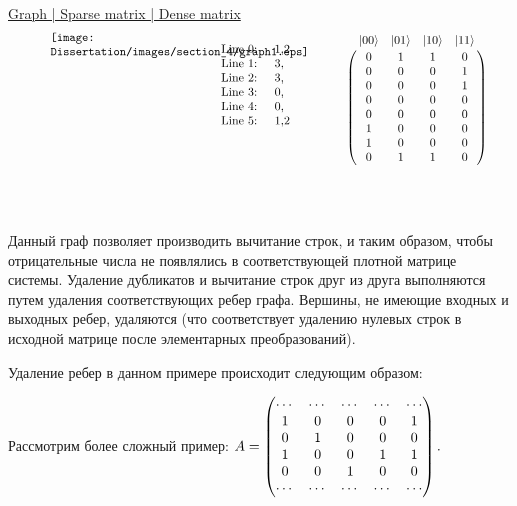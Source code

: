 \hspace{1em}\underline{\hspace{4em} Graph \hspace{4em} | \hspace{1em} Sparse matrix \hspace{2em} | \hspace{3em} Dense matrix \hspace{3em}}\\

\[
\hspace{3.5em}\parbox[b][5cm][t]{50mm}{
	\texttt{[image: Dissertation/images/section\_4/graph1.eps]}
}
\hfill
\parbox[b][5cm][t]{35mm}{
	\begin{flushleft}
		Line 0: \quad 1,2\\
		Line 1: \quad 3,\\
		Line 2: \quad 3,\\
		Line 3: \quad 0,\\
		Line 4: \quad 0,\\
		Line 5: \quad 1,2
	\end{flushleft}
}
\hfill
\parbox[b][5cm][t]{50mm}{
	\bordermatrix{
		& |00\rangle & |01\rangle & |10\rangle & |11\rangle \cr
		& 0 & 1 & 1 & 0 \cr
		& 0 & 0 & 0 & 1 \cr
		& 0 & 0 & 0 & 1 \cr
		& 0 & 0 & 0 & 0 \cr
		& 0 & 0 & 0 & 0 \cr
		& 1 & 0 & 0 & 0 \cr
		& 1 & 0 & 0 & 0 \cr
		& 0 & 1 & 1 & 0 \cr
	}
}\label{eq:graph}
\]
\
\\

Данный граф позволяет производить вычитание строк, и таким образом, чтобы отрицательные числа не появлялись в соответствующей плотной матрице системы. Удаление дубликатов и вычитание строк друг из друга выполняются путем удаления соответствующих ребер графа. Вершины, не имеющие входных и выходных ребер, удаляются (что соответствует удалению нулевых строк в исходной матрице после элементарных преобразований).

Удаление ребер в данном примере происходит следующим образом:
\begin{figure}[h]
	\noindent{}
\end{figure}

Рассмотрим более сложный пример:
$
A =
\begin{pmatrix}
	\cdots & \cdots & \cdots & \cdots & \cdots\\
	1 & 0 & 0 & 0 & 1 \cr
	0 & 1 & 0 & 0 & 0 \cr
	1 & 0 & 0 & 1 & 1 \cr
	0 & 0 & 1 & 0 & 0 \cr
	\cdots & \cdots & \cdots & \cdots & \cdots
\end{pmatrix}.
$

